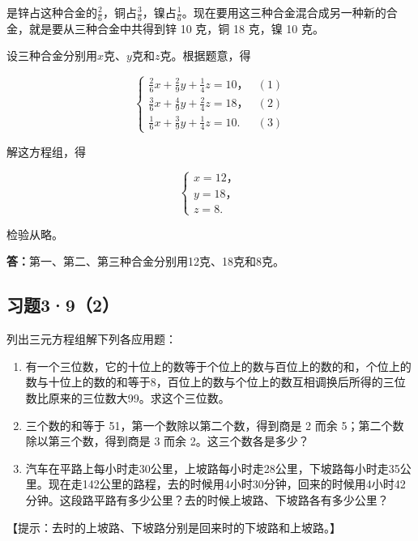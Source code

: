 是锌占这种合金的\(\frac{2}{6}\)，铜占\(\frac{3}{6}\)，镍占\(\frac{1}{6}\)。现在要用这三种合金混合成另一种新的合金，就是要从三种合金中共得到锌
10 克，铜 18 克，镍 10 克。

 设三种合金分别用\(x\)克、\(y\)克和\(z\)克。根据题意，得

\[
\left\{ \begin{array}{ll} \frac{2}{6} x + \frac{2}{9} y + \frac{1}{4} z = 10\text{，} & (1) \\ \frac{3}{6} x + \frac{4}{9} y + \frac{2}{4} z = 18\text{，} & (2) \\ \frac{1}{6} x + \frac{3}{9} y + \frac{1}{4} z = 10. & (3) \end{array} \right.
\]

解这方程组，得

\[
\left\{ \begin{array}{l} x = 12\text{，} \\ y = 18\text{，} \\ z = 8. \end{array} \right.
\]

检验从略。

\textbf{答：}第一、第二、第三种合金分别用12克、18克和8克。

\subsection{习题3·9（2）}

列出三元方程组解下列各应用题：

\begin{enumerate}
\item
  有一个三位数，它的十位上的数等于个位上的数与百位上的数的和，个位上的数与十位上的数的和等于8，百位上的数与个位上的数互相调换后所得的三位数比原来的三位数大99。求这个三位数。
\item
  三个数的和等于 51，第一个数除以第二个数，得到商是 2 而余
  5；第二个数除以第三个数，得到商是 3 而余 2。这三个数各是多少？
\item
  汽车在平路上每小时走30公里，上坡路每小时走28公里，下坡路每小时走35公里。现在走142公里的路程，去的时候用4小时30分钟，回来的时候用4小时42分钟。这段路平路有多少公里？去的时候上坡路、下坡路各有多少公里？
\end{enumerate}

【提示：去时的上坡路、下坡路分别是回来时的下坡路和上坡路。】

